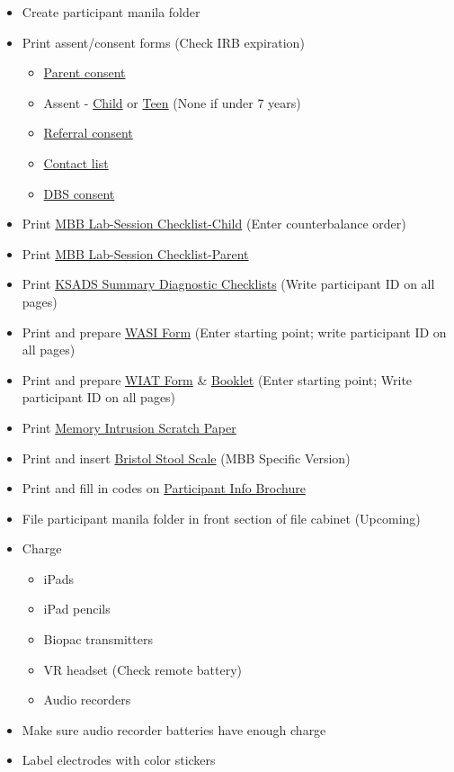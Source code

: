 \documentclass[
]{book}
\providecommand{\tightlist}{%
  \setlength{\itemsep}{0pt}\setlength{\parskip}{0pt}}
\begin{document}
\begin{itemize}
\tightlist
\item
  Create participant manila folder
\item
  Print assent/consent forms (Check IRB expiration)

  \begin{itemize}
  \tightlist
  \item
    \href{https://app.box.com/file/630320519707}{Parent consent}
  \item
    Assent - \href{https://app.box.com/file/630320502379}{Child} or \href{https://app.box.com/file/630326888191}{Teen} (None if under 7 years)
  \item
    \href{https://app.box.com/file/630329099729}{Referral consent}
  \item
    \href{https://app.box.com/file/639652767665}{Contact list}
  \item
    \href{https://app.box.com/file/630326424318}{DBS consent}
  \end{itemize}
\item
  Print \href{https://app.box.com/file/630326484181}{MBB Lab-Session Checklist-Child} (Enter counterbalance order)
\item
  Print \href{https://app.box.com/file/630325295018}{MBB Lab-Session Checklist-Parent}
\item
  Print \href{https://app.box.com/file/630326477910}{KSADS Summary Diagnostic Checklists} (Write participant ID on all pages)
\item
  Print and prepare \href{https://app.box.com/file/630326463909}{WASI Form} (Enter starting point; write participant ID on all pages)
\item
  Print and prepare \href{https://app.box.com/file/630318060264}{WIAT Form} \& \href{https://app.box.com/file/630326404817}{Booklet} (Enter starting point; Write participant ID on all pages)
\item
  Print \href{https://app.box.com/file/630322810250}{Memory Intrusion Scratch Paper}
\item
  Print and insert \href{https://app.box.com/file/630326499609}{Bristol Stool Scale} (MBB Specific Version)
\item
  Print and fill in codes on \href{https://app.box.com/file/630317204624}{Participant Info Brochure}
\item
  File participant manila folder in front section of file cabinet (Upcoming)
\item
  Charge

  \begin{itemize}
  \tightlist
  \item
    iPads
  \item
    iPad pencils
  \item
    Biopac transmitters
  \item
    VR headset (Check remote battery)
  \item
    Audio recorders
  \end{itemize}
\item
  Make sure audio recorder batteries have enough charge
\item
  Label electrodes with color stickers


\end{itemize}
\end{document}
